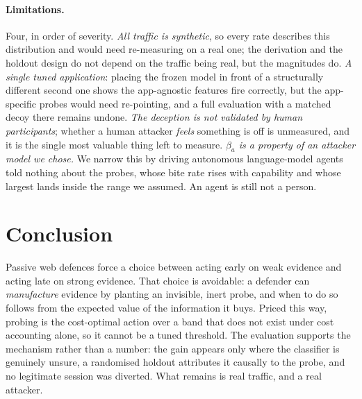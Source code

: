 \documentclass[runningheads]{llncs}
\begin{document}
\paragraph{Limitations.}
Four, in order of severity. \emph{All traffic is synthetic}, so every rate describes
this distribution and would need re-measuring on a real one; the derivation and the
holdout design do not depend on the traffic being real, but the magnitudes do.
\emph{A single tuned application}: placing the frozen model in front of a
structurally different second one shows the app-agnostic features fire correctly,
but the app-specific probes would need re-pointing, and a full evaluation with a
matched decoy there remains undone. \emph{The deception is not validated by human
participants}; whether a human attacker \emph{feels} something is off is unmeasured,
and it is the single most valuable thing left to measure. \emph{$\beta_a$ is a
property of an attacker model we chose.} We narrow this by driving autonomous
language-model agents told nothing about the probes, whose bite rate rises with
capability and whose largest lands inside the range we assumed. An agent is still
not a person.

\section{Conclusion}

Passive web defences force a choice between acting early on weak evidence and acting
late on strong evidence. That choice is avoidable: a defender can \emph{manufacture}
evidence by planting an invisible, inert probe, and when to do so follows from the
expected value of the information it buys. Priced this way, probing is the
cost-optimal action over a band that does not exist under cost accounting alone, so
it cannot be a tuned threshold. The evaluation supports the mechanism rather than a
number: the gain appears only where the classifier is genuinely unsure, a randomised
holdout attributes it causally to the probe, and no legitimate session was diverted.
What remains is real traffic, and a real attacker.

\let\oldthebibliography\thebibliography
\renewcommand{\thebibliography}[1]{%
  \oldthebibliography{#1}%
  \setlength{\itemsep}{0pt}%
  \setlength{\parskip}{0pt}%
}


\end{document}

